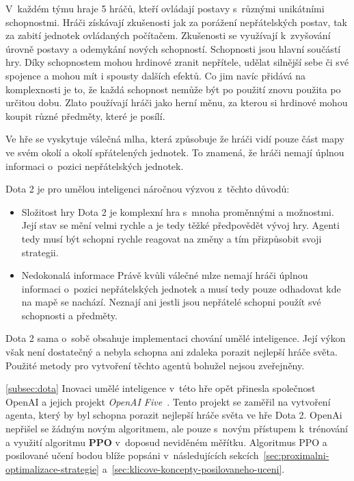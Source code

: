 V~každém týmu hraje 5 hráčů, kteří ovládají postavy s~různými unikátními schopnostmi.
Hráči získávají zkušenosti jak za porážení nepřátelských postav, tak za zabití jednotek ovládaných počítačem.
Zkušenosti se využívají k~zvyšování úrovně postavy a odemykání nových schopností.
Schopnosti jsou hlavní součástí hry.
Díky schopnostem mohou hrdinové zranit nepřítele, udělat silnější sebe či své spojence a mohou mít i spousty dalších efektů.
Co jim navíc přidává na komplexnosti je to, že každá schopnost nemůže být po použití znovu použita po určitou dobu.
Zlato používají hráči jako herní měnu, za kterou si hrdinové mohou koupit různé předměty, které je posílí.

Ve hře se vyskytuje válečná mlha, která způsobuje že hráči vidí pouze část mapy ve svém okolí a okolí spřátelených jednotek.
To znamená, že hráči nemají úplnou informaci o~pozici nepřátelských jednotek.

\bigskip

Dota 2 je pro umělou inteligenci náročnou výzvou z~těchto důvodů:
\begin{itemize}
  \item Složitost hry
  Dota 2 je komplexní hra s~mnoha proměnnými a možnostmi.
  Její stav se mění velmi rychle a je tedy těžké předpovědět vývoj hry.
  Agenti tedy musí být schopni rychle reagovat na změny a tím přizpůsobit svoji strategii.
  \item Nedokonalá informace
  Právě kvůli válečné mlze nemají hráči úplnou informaci o~pozici nepřátelských jednotek a musí tedy pouze odhadovat kde na mapě se nachází.
  Neznají ani jestli jsou nepřátelé schopni použít své schopnosti a předměty.
\end{itemize}

Dota 2 sama o~sobě obsahuje implementaci chování umělé inteligence.
Její výkon však není dostatečný a nebyla schopna ani zdaleka porazit nejlepší hráče světa.
Použité metody pro vytvoření těchto agentů bohužel nejsou zveřejněny.

\ref{subsec:dota}
Inovaci umělé inteligence v~této hře opět přinesla společnost OpenAI a jejich projekt \emph{OpenAI Five}~\cite{Dota2}.
Tento projekt se zaměřil na vytvoření agenta, který by byl schopna porazit nejlepší hráče světa ve hře Dota 2.
OpenAi nepřišel se žádným novým algoritmem, ale pouze s~novým přístupem k~trénování a využití algoritmu \textbf{PPO} v~doposud neviděném měřítku. 
Algoritmus PPO a posilované učení bodou blíže popsáni v~následujících sekcích~\ref{sec:proximalni-optimalizace-strategie} a~\ref{sec:klicove-koncepty-posilovaneho-uceni}.

